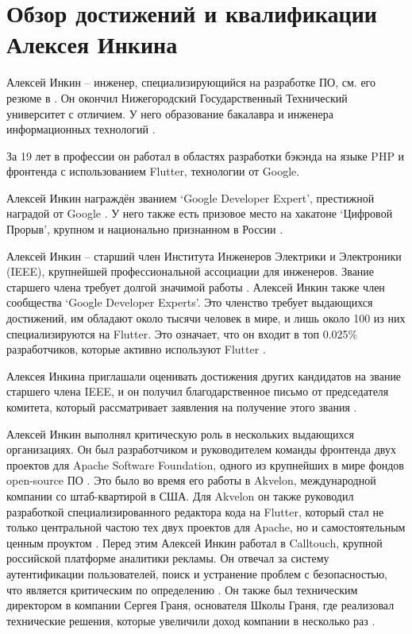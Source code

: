 \section{Обзор достижений и квалификации Алексея Инкина}

Алексей Инкин -- инженер, специализирующийся на разработке ПО, см. его резюме в .
Он окончил Нижегородский Государственный Технический университет с отличием.
У него образование бакалавра 
и инженера информационных технологий .

За 19 лет в профессии он работал в областях разработки бэкэнда на языке PHP
и фронтенда с использованием Flutter, технологии от Google.

Алексей Инкин награждён званием `Google Developer Expert',
престижной наградой от Google .
У него также есть призовое место на хакатоне `Цифровой Прорыв',
крупном и национально признанном в России .

Алексей Инкин -- старший член Института Инженеров Электрики и Электроники (IEEE),
крупнейшей профессиональной ассоциации для инженеров.
Звание старшего члена требует долгой значимой работы .
Алексей Инкин также член сообщества `Google Developer Experts'.
Это членство требует выдающихся достижений,
им обладают около тысячи человек в мире, и лишь около 100 из них специализируются на Flutter.
Это означает, что он входит в топ 0.025\% разработчиков, которые активно используют Flutter .

Алексея Инкина приглашали оценивать достижения других кандидатов на звание старшего члена IEEE,
и он получил благодарственное письмо от председателя комитета,
который рассматривает заявления на получение этого звания .

Алексей Инкин выполнял критическую роль в нескольких выдающихся организациях.
Он был разработчиком и руководителем команды фронтенда двух проектов для Apache Software Foundation,
одного из крупнейших в мире фондов open-source ПО
.
Это было во время его работы в Akvelon, международной компании со штаб-квартирой в США.
Для Akvelon он также руководил разработкой специализированного редактора кода на Flutter,
который стал не только центральной частою тех двух проектов для Apache, но и самостоятельным ценным проуктом
.
Перед этим Алексей Инкин работал в Calltouch, крупной российской платформе аналитики рекламы.
Он отвечал за систему аутентификации пользователей, поиск и устранение
проблем с безопасностью, что является критическим по определению .
Он также был техническим директором в компании Сергея Граня, основателя Школы Граня,
где реализовал технические решения, которые увеличили доход компании в несколько раз .

